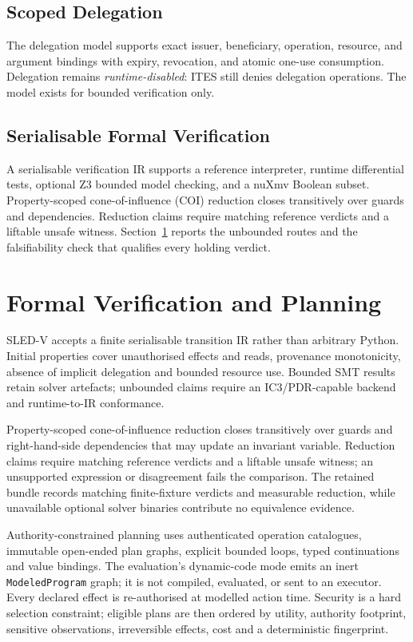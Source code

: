 \documentclass[11pt]{article}
\begin{document}
\subsection{Scoped Delegation}

The delegation model supports exact issuer, beneficiary, operation,
resource, and argument bindings with expiry, revocation, and atomic
one-use consumption. Delegation remains \emph{runtime-disabled}: ITES still
denies delegation operations. The model exists for bounded verification
only.

\subsection{Serialisable Formal Verification}

A serialisable verification IR supports a reference interpreter, runtime
differential tests, optional Z3 bounded model checking, and a nuXmv
Boolean subset. Property-scoped cone-of-influence (COI) reduction closes
transitively over guards and dependencies. Reduction claims require matching
reference verdicts and a liftable unsafe witness. Section~\ref{sec:fv}
reports the unbounded routes and the falsifiability check that
qualifies every holding verdict.


\section{Formal Verification and Planning}
\label{sec:fv}

SLED-V accepts a finite serialisable transition IR rather than arbitrary
Python. Initial properties cover unauthorised effects and reads, provenance
monotonicity, absence of implicit delegation and bounded resource use.
Bounded SMT results retain solver artefacts; unbounded claims require an
IC3/PDR-capable backend and runtime-to-IR conformance.

Property-scoped cone-of-influence reduction closes transitively over guards
and right-hand-side dependencies that may update an invariant variable.
Reduction claims require matching reference verdicts and a liftable unsafe
witness; an unsupported expression or disagreement fails the comparison. The
retained bundle records matching finite-fixture verdicts and measurable
reduction, while unavailable optional solver binaries contribute no
equivalence evidence.

Authority-constrained planning uses authenticated operation catalogues,
immutable open-ended plan graphs, explicit bounded loops, typed continuations
and value bindings. The evaluation's dynamic-code mode emits an inert
\texttt{ModeledProgram} graph; it is not compiled, evaluated, or sent to an
executor. Every declared effect is re-authorised at modelled action time.
Security is a hard selection constraint; eligible plans are then ordered by
utility, authority footprint, sensitive observations, irreversible effects,
cost and a deterministic fingerprint.
\end{document}
